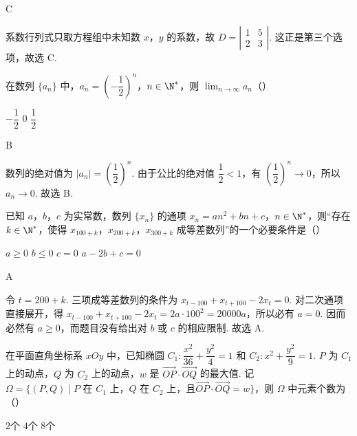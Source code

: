 \begin{answer}
C
\end{answer}

\begin{solution}
系数行列式只取方程组中未知数 \(x\)，\(y\) 的系数，故 \(D=\left|\begin{matrix}1&5\\2&3\end{matrix}\right|\). 这正是第三个选项，故选 C.
\end{solution}

\begin{problem}
在数列 \(\{a_n\}\) 中，\(a_n=\left(-\dfrac12\right)^n\)，\(n\in\N^*\)，则 \(\displaystyle\lim_{n\to\infty}a_n\)（\quad）

\choices
    {\(-\dfrac12\)}
    {\(0\)}
    {\(\dfrac12\)}
    {}
\end{problem}

\begin{answer}
B
\end{answer}

\begin{solution}
数列的绝对值为 \(\lvert a_n\rvert=\left(\dfrac12\right)^n\). 由于公比的绝对值 \(\dfrac12<1\)，有 \(\left(\dfrac12\right)^n\to0\)，所以 \(a_n\to0\). 故选 B.
\end{solution}

\begin{problem}
已知 \(a\)，\(b\)，\(c\) 为实常数，数列 \(\{x_n\}\) 的通项 \(x_n=an^2+bn+c\)，\(n\in\N^*\)，则“存在 \(k\in\N^*\)，使得 \(x_{100+k}\)，\(x_{200+k}\)，\(x_{300+k}\) 成等差数列”的一个必要条件是（\quad）

\choices
    {\(a\ge0\)}
    {\(b\le0\)}
    {\(c=0\)}
    {\(a-2b+c=0\)}
\end{problem}

\begin{answer}
A
\end{answer}

\begin{solution}
令 \(t=200+k\). 三项成等差数列的条件为 \(x_{t-100}+x_{t+100}-2x_t=0\). 对二次通项直接展开，得 \(x_{t-100}+x_{t+100}-2x_t=2a\cdot100^2=20000a\)，所以必有 \(a=0\). 因而必然有 \(a\ge0\)，而题目没有给出对 \(b\) 或 \(c\) 的相应限制. 故选 A.
\end{solution}

\begin{problem}
在平面直角坐标系 \(xOy\) 中，已知椭圆 \(C_1:\dfrac{x^2}{36}+\dfrac{y^2}{4}=1\) 和 \(C_2:x^2+\dfrac{y^2}{9}=1\). \(P\) 为 \(C_1\) 上的动点，\(Q\) 为 \(C_2\) 上的动点，\(w\) 是 \(\overrightarrow{OP}\cdot\overrightarrow{OQ}\) 的最大值. 记 \(\Omega=\{(P,Q)\mid P\text{ 在 }C_1\text{ 上，}Q\text{ 在 }C_2\text{ 上，且}\overrightarrow{OP}\cdot\overrightarrow{OQ}=w\}\)，则 \(\Omega\) 中元素个数为（\quad）

\choices
    {\(2\)个}
    {\(4\)个}
    {\(8\)个}
    {}
\end{problem}


